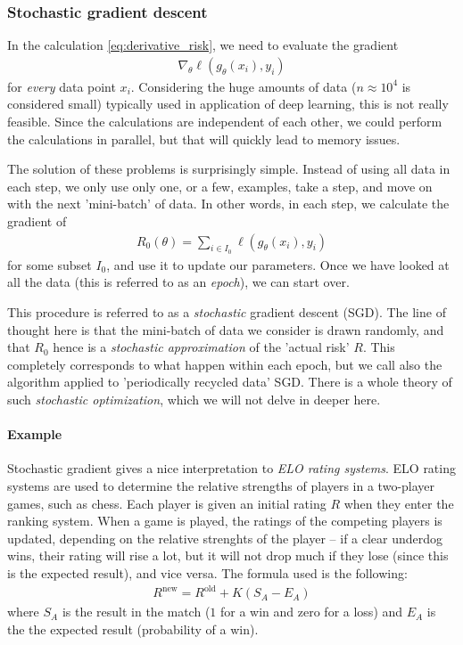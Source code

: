 \documentclass{article}
\begin{document}
\subsubsection{Stochastic gradient descent}
In the calculation \eqref{eq:derivative_risk}, we need to evaluate the gradient
\begin{align*}
    \nabla_\theta \ell(g_\theta(x_i),y_i)
\end{align*}
for \emph{every} data point $x_i$. Considering the huge amounts of data  ($n\approx 10^4$ is considered small) typically used in application of deep learning, this is not really feasible. Since the calculations are independent of each other, we could perform the calculations in parallel, but that will quickly lead to memory issues.

The solution of these problems is surprisingly simple. Instead of using all data in each step, we only use only one, or a few, examples, take a step, and move on with the next 'mini-batch' of data. In other words, in each step, we calculate the gradient of 
\begin{align*}
    R_0(\theta)= \sum_{i \in I_0} \ell(g_\theta(x_i),y_i)
\end{align*}
for some subset $I_0$, and use it to update our parameters. Once we have looked at all the data (this is referred to as an \emph{epoch}), we can start over. 

This procedure is referred to as a \emph{stochastic} gradient descent (SGD). The line of thought here is that the mini-batch of data we consider is drawn randomly, and that $R_0$ hence is a \emph{stochastic approximation} of the 'actual risk' $R$. This completely corresponds to what happen within each epoch, but we call also the algorithm applied to 'periodically recycled data' SGD. There is a whole theory of such \emph{stochastic optimization}, which we will not delve in deeper here.

\paragraph{Example} Stochastic gradient gives a nice interpretation to \emph{ELO rating systems}. ELO rating systems are used to determine the relative strengths of players in a two-player games, such as chess. Each player is given an initial rating $R$ when they enter the ranking system. When a game is played, the ratings of the competing players is updated, depending on the relative strenghts of the player -- if a clear underdog wins, their rating will rise a lot, but it will not drop much if they lose (since this is the expected result), and vice versa. The formula used is the following:
\begin{align}
    R^{\mathrm{new}} = R^{\mathrm{old}} + K(S_A-E_A) \label{eq:ELO_update}
\end{align}
where $S_A$ is the result in the match ($1$ for a win and zero for a loss) and $E_A$ is the the expected result (probability of a win). 
\end{document}
